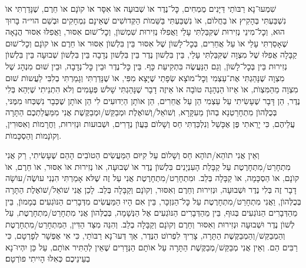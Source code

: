 \documentclass[twoside, openany, parskip=half, 11pt]{book}
\begin{document}
שִׁמְעוּ־נָא רַבּוׂתַי דַּיָּנִים מֻמְחִים, כׇּל־נֶדֶר אוׂ שְׁבוּעָה אוׂ אִסָּר אוׂ קוׂנָם אוׂ חֵרֶם, שֶׁנָּדַרְתִּי אוׂ נִשְׁבַּעְתִּי בְּהָקִיץ אוׂ בַחֲלוׂם, אוׂ נִשְׁבַּעְתִּי בַּשֵּׁמוׂת הַקְּדוׂשִׁים שֶׁאֵינָם נִמְחָקִים וּבְשֵׁם הוי״ה בָּרוּךְ הוּא, וְכׇל־מִינֵי נְזִירוּת שֶׁקִּבַּלְתִּי עָלַי וַאֲפִלּוּ נְזִירוּת שִׁמְשׁוׂן, וְכׇל־שׁוּם אִסּוּר, וַאֲפִלּוּ אִסּוּר הֲנָאָה שֶׁאָסַרְתִּי עָלַי אוׂ עַל אֲחֵרִים, בְּכׇל־לָשׁוׂן שֶׁל אִסּוּר בֵּין בִּלְשׁוׂן אִסּוּר אוׂ חֵרֶם אוׂ קוׂנָם וְכׇל־שׁוּם קַבָּלָה אֲפִלּוּ שֶׁל מִצְוָה שֶׁקִּבַּלְתִּי עָלַי, בֵּין בִּלְשׁון נֶדֶר בֵּין בִּלְשׁון נְדָבָה בֵּין בִּלְשׁוׂן שְׁבוּעָה בֵּין בִּלְשׁוׂן נְזִירוּת בֵּין בְּכׇל־לָשׁוׂן, וְגַם הַנַּעֲשֶׂה בִּתְקִיעַת כָּף. בֵּין כׇּל־נֶדֶר וּבֵין כׇּל־נְדָבָה, וּבֵין שׁוּם מִנְהָג שֶׁל מִצְוָה שֶׁנָּהַגְתִּי אֶת־עַצְמִי וְכׇל־מוׂצָא שְׂפָתַי שֶׁיָּצָא מִפִּי, אוׂ שֶׁנָּדַרְתִּי וְגָמַרְתִּי בְלִבִּי לַעֲשוׂת שׁוּם מִצְוָה מֵהַמִּצְוׂת, אוׂ אֵיזוׂ הַנְהָגָה טוׂבָה אוׂ אֵיזֶה דָבָר שֶׁנָּהַגְתִּי שָׁלשׁ פְּעָמִים וְלא הִתְנֵיתִי שֶׁיְּהֵא בְּלִי נֶדֶר, הֵן דָּבָר שֶׁעָשִׂיתִי עַל עַצְמִי הֵן עַל אֲחֵרִים, הֵן אוׂתָן הַיְדוּעִים לִי הֵן אוׂתָן שֶׁכְּבָר נִשְׁכְּחוּ מִמֶּנּי, בְּכֻלְּהוׂן מִתְחָרַטְנָא בְהוׂן מֵעִקָּרָא, וְשׁוׂאֵל/וְשׁוׂאֶלֶת וּמְבַקֵּשׁ/וּמְבַקֶּשֶׁת אֲנִי מִמַּעֲלַתְכֶם הַתָּרָה עֲלֵיהֶם, כִּי יָרֵאתִי פֶּן אֶכָּשֵׁל וְנִלְכַּדְתִּי חַס וְשָׁלוׂם בַּעֲוׂן נְדָרִים, וּשְׁבוּעות וּנְזִירוּת, וַחֲרָמוׂת וְאִסּוּרִין, וְקוׂנָמוׂת וְהַסְכָּמוׂת.

וְאֵין אֲנִי תוׂהֵא/תוׂהָא חַס וְשָׁלוׂם עַל קִיּוּם הַמַּעֲשִׂים הַטוׂבִים הָהֵם שֶׁעָשִׂיתִי, רַק אֲנִי מִתְחָרֵט/מִתְחָרֶטֶת עַל קַבָּלַת הָעִנְיָנִים בִּלְשׁוׂן נֶדֶר אוׂ שְׁבוּעָה, אוׂ נְזִירוּת אוׂ אִסּוּר, אוׂ חֵרֶם, אוׂ קוׂנָם, אוׂ הַסְכָּמָה, אוׂ קַבָּלָה בְּלֵב. וּמִתְחָרֵט/מִתְחָרֶטֶת אֲנִי עַל זֶה שֶׁלּא אָמַרְתִּי הִנְנִי עוׂשֶׂה/עוׂשָׂה דָבָר זֶה בְּלִי נֶדֶר וּשְׁבוּעָה, וּנְזִירוּת וְחֵרֶם וְאִסּוּר, וְקוׂנָם וְקַבָּלָה בְּלֵב. לָכֵן אֲנִי שׁוׂאֵל/שׁוׂאֶלֶת הַתָּרָה בְּכֻלְּהוׂן, וַאֲנִי מִתְחָרֵט/מִתְחָרֶטֶת עַל כׇּל־הַנִּזְכָּר, בֵּין אִם הָיוּ הַמַּעֲשִׂים מִדְּבָרִים הַנּוׂגְעִים בְּמָמוׂן, בֵּין מֵהַדְּבָרִים הַנּוׂגְעִים בְּגוּף, בֵּין מֵהַדְּבָרִים הַנּוׂגְעִים אֶל הַנְּשָׁמָה, בְּכֻלְּהוׂן אֲנִי מִתְחָרֵט/מִתְחָרֶטֶת, עַל לְשׁוׂן נֶדֶר וּשְׁבוּעָה וּנְזִירוּת וְאִסּוּר וְחֵרֶם וְקוׂנָם וְקַבָּלָה בְלֵב. וְהִנֵּה מִצַּד הַדִּין, הַמִּתְחָרֵט/מִתְחָרֶטֶת וְהַמְבַקֵּשׁ/וְהַמְבַקֶּשֶׁת הַתָּרָה, צָרִיךְ לִפְרוׂט הַנֶּדֶר, אַךְ דְּעוּ־נָא רַבּוׂתַי, כִּי אִי אֶפְשָׁר לְפָרְטָם, כִּי רַבִּים הֵם. וְאֵין אֲנִי מְבַקֵּשׁ/מְבַקֶּשֶׁת הַתָּרָה עַל אוׂתָם הַנְּדָרִים שֶׁאֵין לְהַתִּיר אוׂתָם, עַל כֵּן יִהְיוּ־נָא בְעֵינֵיכֶם כְּאִלּוּ הָיִיתִי פוׂרְטָם׃
\end{document}
